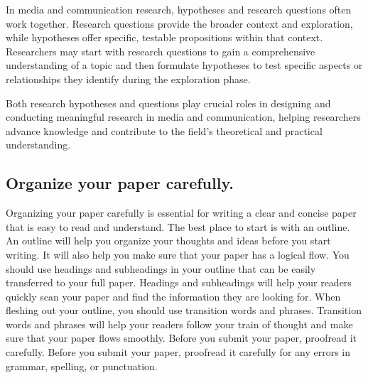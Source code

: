 \documentclass[
  b5paper]{book}
\begin{document}
In media and communication research, hypotheses and research questions often work together. Research questions provide the broader context and exploration, while hypotheses offer specific, testable propositions within that context. Researchers may start with research questions to gain a comprehensive understanding of a topic and then formulate hypotheses to test specific aspects or relationships they identify during the exploration phase.

Both research hypotheses and questions play crucial roles in designing and conducting meaningful research in media and communication, helping researchers advance knowledge and contribute to the field's theoretical and practical understanding.

\hypertarget{organize-your-paper-carefully.}{%
\subsection*{Organize your paper carefully.}\label{organize-your-paper-carefully.}}

Organizing your paper carefully is essential for writing a clear and concise paper that is easy to read and understand. The best place to start is with an outline. An outline will help you organize your thoughts and ideas before you start writing. It will also help you make sure that your paper has a logical flow. You should use headings and subheadings in your outline that can be easily transferred to your full paper. Headings and subheadings will help your readers quickly scan your paper and find the information they are looking for. When fleshing out your outline, you should use transition words and phrases. Transition words and phrases will help your readers follow your train of thought and make sure that your paper flows smoothly. Before you submit your paper, proofread it carefully. Before you submit your paper, proofread it carefully for any errors in grammar, spelling, or punctuation.
\end{document}
